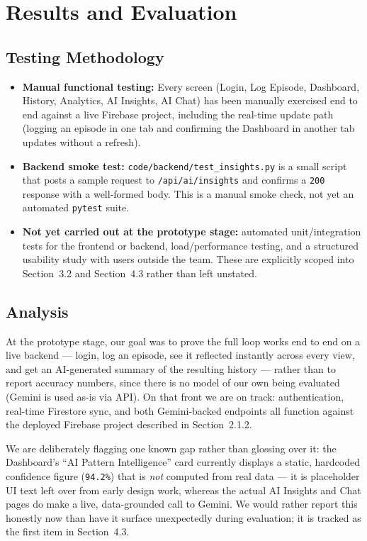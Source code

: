 \documentclass[11pt,a4paper]{article}
\begin{document}
\section{Results and Evaluation}

\subsection{Testing Methodology}
\begin{itemize}
    \item \textbf{Manual functional testing:} Every screen (Login, Log Episode, Dashboard,
    History, Analytics, AI Insights, AI Chat) has been manually exercised end to end against a
    live Firebase project, including the real-time update path (logging an episode in one tab
    and confirming the Dashboard in another tab updates without a refresh).
    \item \textbf{Backend smoke test:} \texttt{code/backend/test\_insights.py} is a small script
    that posts a sample request to \texttt{/api/ai/insights} and confirms a \texttt{200}
    response with a well-formed body. This is a manual smoke check, not yet an automated
    \texttt{pytest} suite.
    \item \textbf{Not yet carried out at the prototype stage:} automated unit/integration tests
    for the frontend or backend, load/performance testing, and a structured usability study with
    users outside the team. These are explicitly scoped into Section~3.2 and Section~4.3 rather
    than left unstated.
\end{itemize}

\subsection{Analysis}
At the prototype stage, our goal was to prove the full loop works end to end on a live backend
— login, log an episode, see it reflected instantly across every view, and get an AI-generated
summary of the resulting history — rather than to report accuracy numbers, since there is no
model of our own being evaluated (Gemini is used as-is via API). On that front we are on track:
authentication, real-time Firestore sync, and both Gemini-backed endpoints all function against
the deployed Firebase project described in Section~2.1.2.

We are deliberately flagging one known gap rather than glossing over it: the Dashboard's ``AI
Pattern Intelligence'' card currently displays a static, hardcoded confidence figure
(\texttt{94.2\%}) that is \emph{not} computed from real data — it is placeholder UI text left
over from early design work, whereas the actual AI Insights and Chat pages do make a live,
data-grounded call to Gemini. We would rather report this honestly now than have it surface
unexpectedly during evaluation; it is tracked as the first item in Section~4.3.
\end{document}
